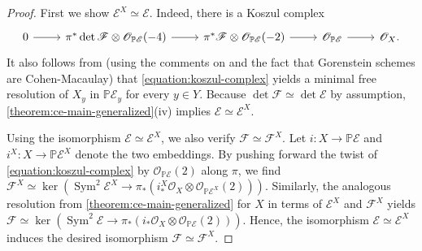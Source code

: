 \documentclass[12 pt]{amsart}
\theoremstyle{plain}
\theoremstyle{definition}
\theoremstyle{remark}
\numberwithin{equation}{section}
\newcommand\bp{\mathbb P}
\newcommand\bz{\mathbb Z}
\newcommand\sce{\mathscr E}
\newcommand\scf{\mathscr F}
\newcommand\sco{\mathscr O}
\DeclareMathOperator\spec{\operatorname{Spec}}
\newcommand\coverstack[1]{\mathrm{Covers}_{d}} %
\DeclareMathOperator\sym{Sym}
\begin{document}
\begin{proof}
	First we show $\sce^X \simeq \sce$. 
%
	Indeed, there is a Koszul complex
	\begin{equation}
		\label{equation:koszul-complex}
		\begin{tikzcd}
			0 \ar {r} & \pi^* \det \scf \otimes \sco_{\bp \sce}(-4)
			\ar {r} & \pi^* \scf \otimes \sco_{\bp \sce}(-2) \ar {r} &
			\sco_{\bp \sce} \ar {r}
			& \sco_X.
	\end{tikzcd}\end{equation}
	It also follows from 
	\cite[Theorem 20.15]{Eisenbud:commutativeAlgebra}
	(using the comments on \cite[p. 503]{Eisenbud:commutativeAlgebra}
	and the fact that Gorenstein schemes are Cohen-Macaulay)
	that
	\eqref{equation:koszul-complex} yields a minimal free resolution of
	$X_y$ in $\bp \sce_y$ for every $y \in Y$.
	Because $\det \scf \simeq \det \sce$ by assumption,
	\autoref{theorem:ce-main-generalized}(iv) implies $\sce \simeq \sce^X$.

	Using the isomorphism $\sce \simeq \sce^X$, we also verify $\scf \simeq
	\scf^X$.
	Let $i: X \to \bp \sce$ and $i^X: X \to \bp \sce^X$ denote the two
	embeddings.
	By pushing forward the twist of \eqref{equation:koszul-complex} by
	$\sco_{\bp \sce}(2)$ along $\pi$, we find $\scf^X \simeq
	\ker\left(\sym^2 \sce^X
	\to \pi_* \left(i^X_* \sco_X \otimes \sco_{\bp \sce^X}(2) \right) \right)$.
	Similarly, 
	the analogous resolution from \autoref{theorem:ce-main-generalized}
	for $X$ in terms of $\sce^X$ and $\scf^X$ yields
	$\scf \simeq
	\ker\left(\sym^2 \sce
	\to \pi_* \left(i_* \sco_X \otimes \sco_{\bp \sce}(2) \right) \right)$.
	Hence, the isomorphism
	$\sce \simeq \sce^X$ induces the desired isomorphism $\scf \simeq
	\scf^X$.



\end{proof}
\end{document}
